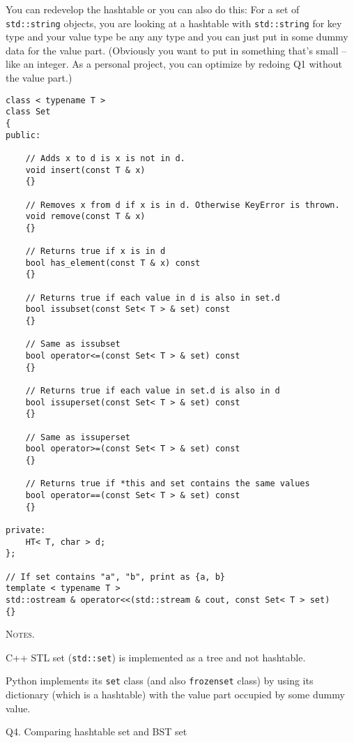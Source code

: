 You can redevelop the hashtable or you can also do this:
For a set of \verb!std::string! objects, you are looking at a 
hashtable with \verb!std::string! for key type and your
value type be any any type and you can just put in some dummy data
for the value part.
(Obviously you want to put in something that's small -- like an
integer.
As a personal project, you can optimize by redoing Q1 without the value part.)

{\small
\begin{Verbatim}[frame=single]
class < typename T >
class Set
{
public:

    // Adds x to d is x is not in d.
    void insert(const T & x)
    {}

    // Removes x from d if x is in d. Otherwise KeyError is thrown.
    void remove(const T & x)
    {}

    // Returns true if x is in d
    bool has_element(const T & x) const
    {}

    // Returns true if each value in d is also in set.d
    bool issubset(const Set< T > & set) const
    {}

    // Same as issubset
    bool operator<=(const Set< T > & set) const
    {}

    // Returns true if each value in set.d is also in d
    bool issuperset(const Set< T > & set) const
    {}

    // Same as issuperset
    bool operator>=(const Set< T > & set) const
    {}

    // Returns true if *this and set contains the same values
    bool operator==(const Set< T > & set) const
    {}

private:
    HT< T, char > d;
};

// If set contains "a", "b", print as {a, b}
template < typename T >
std::ostream & operator<<(std::stream & cout, const Set< T > set)
{}
\end{Verbatim}
}

\textsc{Notes.}
\begin{tightlist}
  \item  C++ STL set (\verb!std::set!) is implemented as a tree and not
  hashtable.
  \item Python implements its
  \verb!set! class (and also \verb!frozenset! class)
  by using its dictionary (which is a hashtable)
  with the value part occupied by some dummy value.
\end{tightlist}


\newpage
Q4. Comparing hashtable set and BST set

